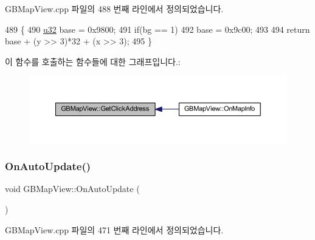 G\+B\+Map\+View.\+cpp 파일의 488 번째 라인에서 정의되었습니다.


\begin{DoxyCode}
489 \{
490   \mbox{\hyperlink{_system_8h_a10e94b422ef0c20dcdec20d31a1f5049}{u32}} base = 0x9800;
491   \textcolor{keywordflow}{if}(bg == 1)
492     base = 0x9c00;
493 
494   \textcolor{keywordflow}{return} base + (y >> 3)*32 + (x >> 3);
495 \}
\end{DoxyCode}
이 함수를 호출하는 함수들에 대한 그래프입니다.\+:
\nopagebreak
\begin{figure}[H]
\begin{center}
\leavevmode
\includegraphics[width=350pt]{class_g_b_map_view_a8071362b1d60245c02266c3d48d51495_icgraph}
\end{center}
\end{figure}
\mbox{\label{class_g_b_map_view_ad58a2f86c686e80be789229bdee2e64f}} 
\subsubsection{\texorpdfstring{On\+Auto\+Update()}{OnAutoUpdate()}}
{\footnotesize\ttfamily void G\+B\+Map\+View\+::\+On\+Auto\+Update (\begin{DoxyParamCaption}{ }\end{DoxyParamCaption})\hspace{0.3cm}{\ttfamily [protected]}}



G\+B\+Map\+View.\+cpp 파일의 471 번째 라인에서 정의되었습니다.


